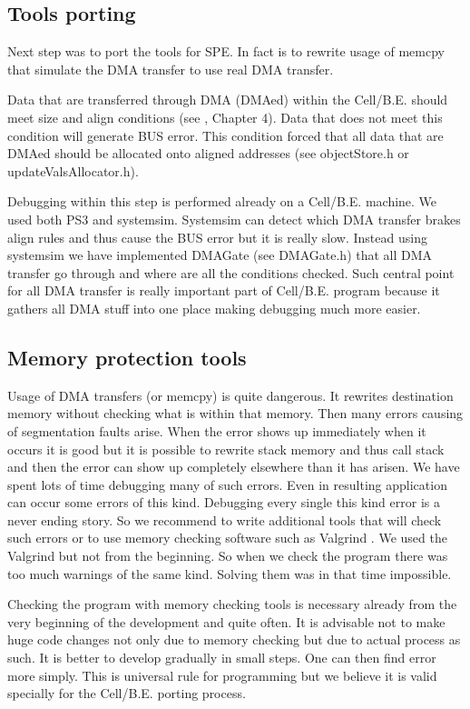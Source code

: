 \subsection{Tools porting}

\par
Next step was to port the tools for SPE.
In fact is to rewrite usage of memcpy that simulate the DMA transfer to use real DMA transfer.

\par
Data that are transferred through DMA (DMAed) within the \mbox{Cell/B.E.} should meet size and align conditions (see \cite{programmersGuide}, Chapter 4).
Data that does not meet this condition will generate BUS error.
This condition forced that all data that are DMAed should be allocated onto aligned addresses (see objectStore.h or updateValsAllocator.h).

\par
Debugging within this step is performed already on a \mbox{Cell/B.E.} machine.
We used both PS3 and systemsim.
Systemsim can detect which DMA transfer brakes align rules and thus cause the BUS error but it is really slow.
Instead using systemsim we have implemented DMAGate (see DMAGate.h) that all DMA transfer go through and where are all the conditions checked.
Such central point for all DMA transfer is really important part of \mbox{Cell/B.E.} program because it gathers all DMA stuff into one place making debugging much more easier.

\subsection{Memory protection tools}

\par
Usage of DMA transfers (or memcpy) is quite dangerous.
It rewrites destination memory without checking what is within that memory.
Then many errors causing of segmentation faults arise.
When the error shows up immediately when it occurs it is good but it is possible to rewrite stack memory and thus call stack and then the error can show up completely elsewhere than it has arisen.
We have spent lots of time debugging many of such errors.
Even in resulting application can occur some errors of this kind.
Debugging every single this kind error is a never ending story.
So we recommend to write additional tools that will check such errors or to use memory checking software such as Valgrind \cite{valgrind}.
We used the Valgrind but not from the beginning.
So when we check the program there was too much warnings of the same kind.
Solving them was in that time impossible.

\par
Checking the program with memory checking tools is necessary already from the very beginning of the development and quite often.
It is advisable not to make huge code changes not only due to memory checking but due to actual process as such.
It is better to develop gradually in small steps.
One can then find error more simply.
This is universal rule for programming but we believe it is valid specially for the \mbox{Cell/B.E.} porting process.
